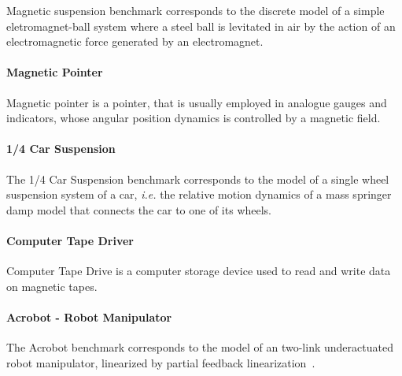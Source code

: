 \documentclass[sigconf]{llncs}
\begin{document}
{Magnetic suspension benchmark corresponds to the discrete model of a 
simple eletromagnet-ball system where a steel ball is levitated in air 
by the action of an electromagnetic force generated by an electromagnet.

\paragraph*{Magnetic Pointer}

Magnetic pointer is a pointer, that is usually employed in analogue 
gauges and indicators, whose angular position dynamics is controlled 
by a magnetic field.

\paragraph*{1/4 Car Suspension}

The 1/4 Car Suspension benchmark corresponds to the model of a single 
wheel suspension system of a car, {\it i.e.} the relative motion dynamics 
of a mass springer damp model that connects the car to one of its wheels.

\paragraph*{Computer Tape Driver}

Computer Tape Drive is a computer storage device used to read and write 
data on magnetic tapes.

\paragraph*{Acrobot - Robot Manipulator}

The Acrobot benchmark corresponds to the model of an two-link 
underactuated robot manipulator, linearized by partial 
feedback linearization~\cite{acrobot}.

}
\end{document}
